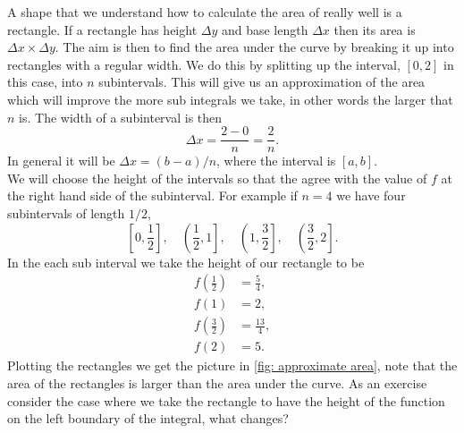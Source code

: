 A shape that we understand how to calculate the area of really well is a rectangle. If a rectangle has height $\Delta y$ and base length $\Delta x$ then its area is $\Delta x \times \Delta y$. The aim is then to find the area under the curve by breaking it up into rectangles with a regular width. We do this by splitting up the interval, $[0,2]$ in this case, into $n$ subintervals. This will give us an approximation of the area which will improve the more sub integrals we take, in other words the larger that $n$ is. The width of a subinterval is then 
\begin{equation*}
\Delta x=\frac{2-0}{n}=\frac{2}{n}.
\end{equation*}
In general it will be $\Delta x=(b-a)/n$, where the interval is $[a,b]$. \\

We will choose the height of the intervals so that the agree with the value of $f$ at the right hand side of the subinterval. For example if $n=4$ we have four subintervals of length $1/2$, 
\begin{equation*}
\left[0,\frac{1}{2}\right], \quad \left(\frac{1}{2},1\right], \quad \left(1,\frac{3}{2}\right], \quad \left(\frac{3}{2},2\right].
\end{equation*}
In the each sub interval we take the height of our rectangle to be 
\begin{align*}
f\left(\frac{1}{2}\right)&=\frac{5}{4},\\
f(1)&=2,\\
f\left(\frac{3}{2}\right)&=\frac{13}{4},\\
f(2)&=5.
\end{align*}
Plotting the rectangles we get the picture in \cref{fig: approximate area}, note that the area of the rectangles is larger than the area under the curve. As an exercise consider the case where we take the rectangle to have the height of the function on the left boundary of the integral, what changes?\\


